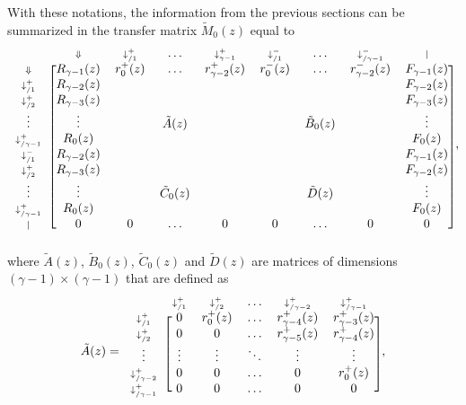 \documentclass{article}
\begin{document}
With these notations, the information from the previous sections can be
summarized in the transfer matrix $\tilde{M}_0(z)$ equal to
\begin{equation*}
\begin{blockarray}{ccccccccc}
   & \scriptstyle{\Downarrow} & \scriptstyle{\downarrow_{/1}^+} & 
    \ldots & \scriptstyle{\downarrow_{\gamma-1}^+} &
    \scriptstyle{\downarrow_{/1}^-} & \ldots &
    \scriptstyle{\downarrow_{/\gamma-1}^-} & \scriptstyle{|} \\
\begin{block}{c[cccccccc]}
\scriptstyle{\Downarrow} & R_{\gamma-1}(z)  & r_0^+(z) & \ldots &
    r_{\gamma-2}^+(z) & r_0^-(z) & \ldots & r_{\gamma-2}^-(z) &
    F_{\gamma-1}(z) \\
\scriptstyle{\downarrow_{/1}^+} & R_{\gamma-2}(z) & & & & & & &
    F_{\gamma-2}(z) \\
\scriptstyle{\downarrow_{/2}^+} & R_{\gamma-3}(z) & & & & & & &
    F_{\gamma-3}(z) \\
\vdots & \vdots & & \tilde{A}(z) & & & \tilde{B}_0(z) & & \vdots \\
\scriptstyle{\downarrow_{/\gamma-1}^+} & R_0(z) & & & & & & & F_0(z) \\
\scriptstyle{\downarrow_{/1}^-} & R_{\gamma-2}(z) & & & & & & &
    F_{\gamma-1}(z) \\
\scriptstyle{\downarrow_{/2}^+} & R_{\gamma-3}(z) & & & & & & &
    F_{\gamma-2}(z) \\
\vdots & \vdots & & \tilde{C}_0(z) & & & \tilde{D}(z) & & \vdots \\
\scriptstyle{\downarrow_{/\gamma-1}^+} & R_0(z) & & & & & & & F_0(z) \\
\scriptstyle{|} & 0 & 0 & \ldots & 0 & 0 & \ldots & 0 & 0 \\
\end{block}
\end{blockarray},
\end{equation*}
where $\tilde{A}(z)$, $\tilde{B}_0(z)$, $\tilde{C}_0(z)$ and
$\tilde{D}(z)$ are matrices of dimensions $(\gamma-1) \times (\gamma-1)$
that are defined as
\begin{equation*}
\tilde{A}(z) = 
\begin{blockarray}{cccccc}
   & \scriptstyle{\downarrow_{/1}^+} & \scriptstyle{\downarrow_{/2}^+} &
    \ldots & \scriptstyle{\downarrow_{/\gamma-2}^+} &
    \scriptstyle{\downarrow_{/\gamma-1}^+} \\
\begin{block}{c[ccccc]}
\scriptstyle{\downarrow_{/1}^+} & 0 & r_0^+(z) & \ldots &
    r_{\gamma-4}^+(z) & r_{\gamma-3}^+(z) \\
\scriptstyle{\downarrow_{/2}^+} & 0 & 0 & \ldots &
    r_{\gamma-5}^+(z) & r_{\gamma-4}^+(z) \\
\vdots & \vdots & \vdots & \ddots & \vdots & \vdots \\
\scriptstyle{\downarrow_{/\gamma-2}^+} & 0 & 0 & \ldots & 0 & r_0^+(z) \\
\scriptstyle{\downarrow_{/\gamma-1}^+} & 0 & 0 & \ldots & 0 & 0 \\
\end{block}
\end{blockarray},
\end{equation*}
\end{document}
